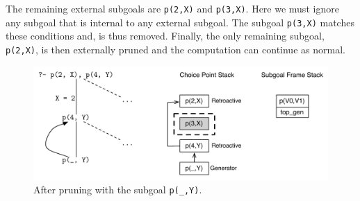 The remaining external subgoals are \texttt{p(2,X)} and \texttt{p(3,X)}. Here we must ignore any subgoal
that is internal to any external subgoal. The subgoal \texttt{p(3,X)} matches these conditions and, is thus
removed. Finally, the only remaining subgoal, \texttt{p(2,X)}, is then externally pruned and the computation
can continue as normal.

\begin{figure}[ht]
  \centering
    \includegraphics[scale=0.6]{retro_mix_multiple_after.pdf}
  \caption{After pruning with the subgoal \texttt{p(\_,Y)}.}
  \label{fig:retro_mix_multiple_after}
\end{figure}

